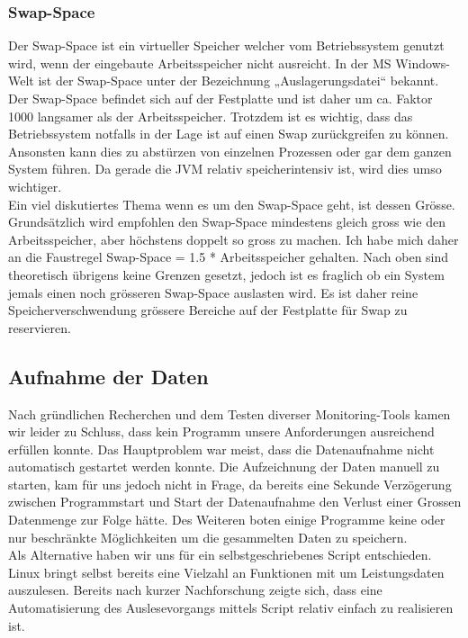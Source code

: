 \documentclass{fancydocument}
\begin{document}
\subsubsection{Swap-Space}
Der Swap-Space ist ein virtueller Speicher welcher vom Betriebssystem genutzt wird, wenn der eingebaute Arbeitsspeicher nicht ausreicht. In der MS Windows-Welt ist der Swap-Space unter der Bezeichnung „Auslagerungsdatei“ bekannt. Der Swap-Space befindet sich auf der Festplatte und ist daher um ca. Faktor 1000 langsamer als der Arbeitsspeicher. Trotzdem ist es wichtig, dass das Betriebssystem notfalls in der Lage ist auf einen Swap zurückgreifen zu können. Ansonsten kann dies zu abstürzen von einzelnen Prozessen oder gar dem ganzen System führen. Da gerade die JVM relativ speicherintensiv ist, wird dies umso wichtiger.
\\
Ein viel diskutiertes Thema wenn es um den Swap-Space geht, ist dessen Grösse. Grundsätzlich wird empfohlen den Swap-Space mindestens gleich gross wie den Arbeitsspeicher, aber höchstens doppelt so gross zu machen. Ich habe mich daher an die Faustregel Swap-Space = 1.5 * Arbeitsspeicher gehalten. Nach oben sind theoretisch übrigens keine Grenzen gesetzt, jedoch ist es fraglich ob ein System jemals einen noch grösseren Swap-Space auslasten wird. Es ist daher reine Speicherverschwendung grössere Bereiche auf der Festplatte für Swap zu reservieren.

\subsection{Aufnahme der Daten}
Nach gründlichen Recherchen und dem Testen diverser Monitoring-Tools kamen wir leider zu Schluss, dass kein Programm unsere Anforderungen ausreichend erfüllen konnte. Das Hauptproblem war meist, dass die Datenaufnahme nicht automatisch gestartet werden konnte. Die Aufzeichnung der Daten manuell zu starten, kam für uns jedoch nicht in Frage, da bereits eine Sekunde Verzögerung zwischen Programmstart und Start der Datenaufnahme den Verlust einer Grossen Datenmenge zur Folge hätte. Des Weiteren boten einige Programme keine oder  nur beschränkte Möglichkeiten um die gesammelten Daten zu speichern.
\\
Als Alternative haben wir uns für ein selbstgeschriebenes Script entschieden. Linux bringt selbst bereits eine Vielzahl an Funktionen mit um Leistungsdaten auszulesen. Bereits nach kurzer Nachforschung zeigte sich, dass eine Automatisierung des Auslesevorgangs mittels Script relativ einfach zu realisieren ist.
\end{document}
